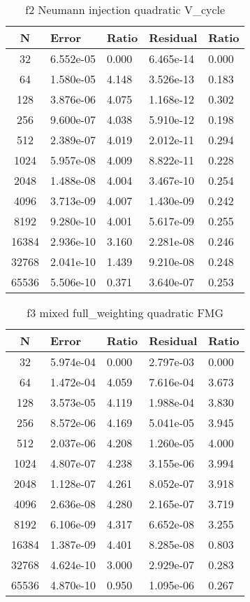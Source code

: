 \documentclass[12]{article}%
\begin{document}
\begin{table}[H]
    \centering
    \caption{f2 Neumann injection quadratic V\_cycle}
    \begin{tabular}{|c|l|l|l|l|}
    \hline
    N & Error       & Ratio     & Residual    & Ratio     \\ \hline
    32 & 6.552e-05 & 0.000 & 6.465e-14 & 0.000\\ \hline 
    64 & 1.580e-05 & 4.148 & 3.526e-13 & 0.183\\ \hline 
    128 & 3.876e-06 & 4.075 & 1.168e-12 & 0.302\\ \hline 
    256 & 9.600e-07 & 4.038 & 5.910e-12 & 0.198\\ \hline 
    512 & 2.389e-07 & 4.019 & 2.012e-11 & 0.294\\ \hline 
    1024 & 5.957e-08 & 4.009 & 8.822e-11 & 0.228\\ \hline 
    2048 & 1.488e-08 & 4.004 & 3.467e-10 & 0.254\\ \hline 
    4096 & 3.713e-09 & 4.007 & 1.430e-09 & 0.242\\ \hline 
    8192 & 9.280e-10 & 4.001 & 5.617e-09 & 0.255\\ \hline 
    16384 & 2.936e-10 & 3.160 & 2.281e-08 & 0.246\\ \hline 
    32768 & 2.041e-10 & 1.439 & 9.210e-08 & 0.248\\ \hline 
    65536 & 5.506e-10 & 0.371 & 3.640e-07 & 0.253\\ \hline        \end{tabular}
\end{table}

\begin{table}[H]
    \centering
    \caption{f3 mixed full\_weighting quadratic FMG}
    \begin{tabular}{|c|l|l|l|l|}
    \hline
    N & Error       & Ratio     & Residual    & Ratio     \\ \hline
    32 & 5.974e-04 & 0.000 & 2.797e-03 & 0.000\\ \hline 
    64 & 1.472e-04 & 4.059 & 7.616e-04 & 3.673\\ \hline 
    128 & 3.573e-05 & 4.119 & 1.988e-04 & 3.830\\ \hline 
    256 & 8.572e-06 & 4.169 & 5.041e-05 & 3.945\\ \hline 
    512 & 2.037e-06 & 4.208 & 1.260e-05 & 4.000\\ \hline 
    1024 & 4.807e-07 & 4.238 & 3.155e-06 & 3.994\\ \hline 
    2048 & 1.128e-07 & 4.261 & 8.052e-07 & 3.918\\ \hline 
    4096 & 2.636e-08 & 4.280 & 2.165e-07 & 3.719\\ \hline 
    8192 & 6.106e-09 & 4.317 & 6.652e-08 & 3.255\\ \hline 
    16384 & 1.387e-09 & 4.401 & 8.285e-08 & 0.803\\ \hline 
    32768 & 4.624e-10 & 3.000 & 2.929e-07 & 0.283\\ \hline 
    65536 & 4.870e-10 & 0.950 & 1.095e-06 & 0.267\\ \hline         \end{tabular}
\end{table}
\end{document}
